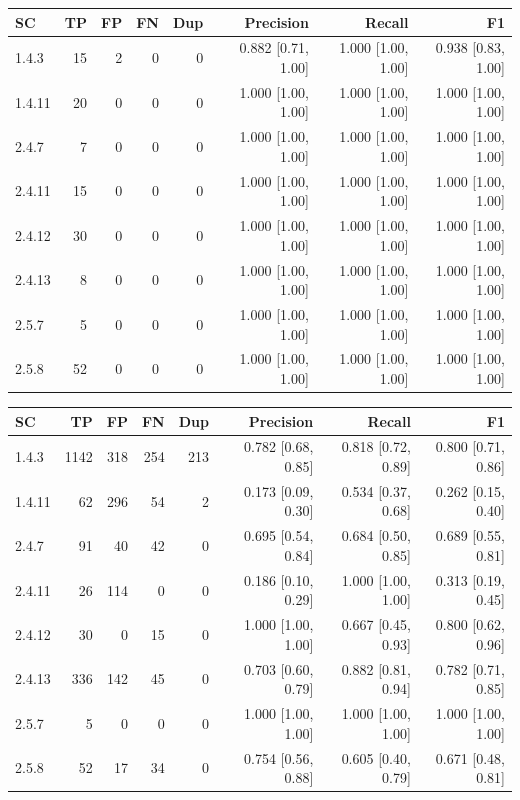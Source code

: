 \begin{tabular}{lrrrrrrr}
\hline
SC & TP & FP & FN & Dup & Precision & Recall & F1 \\
\hline
1.4.3 & 15 & 2 & 0 & 0 & 0.882 [0.71, 1.00] & 1.000 [1.00, 1.00] & 0.938 [0.83, 1.00] \\
1.4.11 & 20 & 0 & 0 & 0 & 1.000 [1.00, 1.00] & 1.000 [1.00, 1.00] & 1.000 [1.00, 1.00] \\
2.4.7 & 7 & 0 & 0 & 0 & 1.000 [1.00, 1.00] & 1.000 [1.00, 1.00] & 1.000 [1.00, 1.00] \\
2.4.11 & 15 & 0 & 0 & 0 & 1.000 [1.00, 1.00] & 1.000 [1.00, 1.00] & 1.000 [1.00, 1.00] \\
2.4.12 & 30 & 0 & 0 & 0 & 1.000 [1.00, 1.00] & 1.000 [1.00, 1.00] & 1.000 [1.00, 1.00] \\
2.4.13 & 8 & 0 & 0 & 0 & 1.000 [1.00, 1.00] & 1.000 [1.00, 1.00] & 1.000 [1.00, 1.00] \\
2.5.7 & 5 & 0 & 0 & 0 & 1.000 [1.00, 1.00] & 1.000 [1.00, 1.00] & 1.000 [1.00, 1.00] \\
2.5.8 & 52 & 0 & 0 & 0 & 1.000 [1.00, 1.00] & 1.000 [1.00, 1.00] & 1.000 [1.00, 1.00] \\
\hline
\end{tabular}

\begin{tabular}{lrrrrrrr}
\hline
SC & TP & FP & FN & Dup & Precision & Recall & F1 \\
\hline
1.4.3 & 1142 & 318 & 254 & 213 & 0.782 [0.68, 0.85] & 0.818 [0.72, 0.89] & 0.800 [0.71, 0.86] \\
1.4.11 & 62 & 296 & 54 & 2 & 0.173 [0.09, 0.30] & 0.534 [0.37, 0.68] & 0.262 [0.15, 0.40] \\
2.4.7 & 91 & 40 & 42 & 0 & 0.695 [0.54, 0.84] & 0.684 [0.50, 0.85] & 0.689 [0.55, 0.81] \\
2.4.11 & 26 & 114 & 0 & 0 & 0.186 [0.10, 0.29] & 1.000 [1.00, 1.00] & 0.313 [0.19, 0.45] \\
2.4.12 & 30 & 0 & 15 & 0 & 1.000 [1.00, 1.00] & 0.667 [0.45, 0.93] & 0.800 [0.62, 0.96] \\
2.4.13 & 336 & 142 & 45 & 0 & 0.703 [0.60, 0.79] & 0.882 [0.81, 0.94] & 0.782 [0.71, 0.85] \\
2.5.7 & 5 & 0 & 0 & 0 & 1.000 [1.00, 1.00] & 1.000 [1.00, 1.00] & 1.000 [1.00, 1.00] \\
2.5.8 & 52 & 17 & 34 & 0 & 0.754 [0.56, 0.88] & 0.605 [0.40, 0.79] & 0.671 [0.48, 0.81] \\
\hline
\end{tabular}


